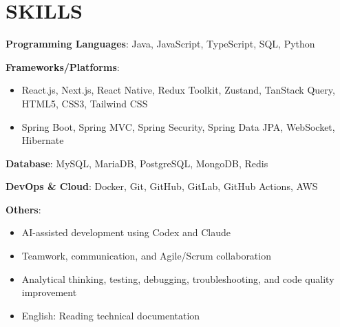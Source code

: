 \section{SKILLS}
\resumeSubHeadingListStart

  \item
    \resumeItemListStart
      \item \textbf{Programming Languages}: Java, JavaScript, TypeScript, SQL, Python
      \item \textbf{Frameworks/Platforms}:
        \begin{itemize}
          \item React.js, Next.js, React Native, Redux Toolkit, Zustand, TanStack Query, HTML5, CSS3, Tailwind CSS
          \item Spring Boot, Spring MVC, Spring Security, Spring Data JPA, WebSocket, Hibernate
        \end{itemize}
      \item \textbf{Database}: MySQL, MariaDB, PostgreSQL, MongoDB, Redis
      \item \textbf{DevOps \& Cloud}: Docker, Git, GitHub, GitLab, GitHub Actions, AWS
      \item \textbf{Others}:
        \begin{itemize}
          \item AI-assisted development using Codex and Claude
          \item Teamwork, communication, and Agile/Scrum collaboration
          \item Analytical thinking, testing, debugging, troubleshooting, and code quality improvement
          \item English: Reading technical documentation
        \end{itemize}
    \resumeItemListEnd

\resumeSubHeadingListEnd
